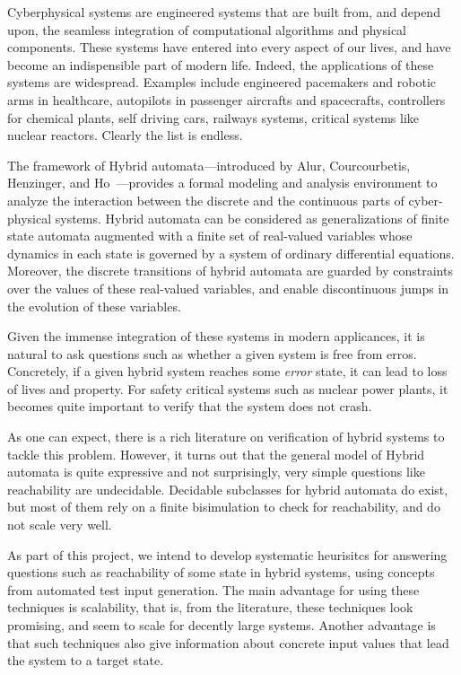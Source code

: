 Cyberphysical systems are engineered systems that are built from, 
and depend upon, the seamless integration of computational algorithms and physical components.
These systems have entered into every aspect of our lives, and have become an
indispensible part of modern life.
Indeed, the applications of these systems are widespread.
Examples include engineered pacemakers and robotic arms in healthcare, autopilots in
passenger aircrafts and spacecrafts, controllers for chemical plants,
self driving cars, railways systems, critical systems like
nuclear reactors. Clearly the list is endless.

  The framework of Hybrid automata---introduced by Alur, Courcourbetis,
  Henzinger, and Ho~\cite{ACH92}---provides a formal modeling and analysis environment to
  analyze the interaction between the discrete and the continuous parts of
  cyber-physical systems. 
  Hybrid automata can be considered as generalizations of finite state automata
  augmented with a finite set of real-valued variables whose dynamics in each
  state is governed by a system of ordinary differential equations. 
  Moreover, the discrete transitions of hybrid automata are guarded by
  constraints over the values of these real-valued variables, and enable
  discontinuous jumps in the evolution of these variables.
  


Given the immense integration of these systems in modern applicances,
it is natural to ask questions such as whether a given system is free from erros.
Concretely, if a given hybrid system reaches some \emph{error} state, it can lead 
to loss of lives and property. For safety critical systems such as nuclear power plants,
it becomes quite important to verify that the system does not crash. 

As one can expect, there is a rich literature on verification
of hybrid systems to tackle this problem. 
However, it turns out that the  general model of Hybrid automata is quite expressive
and not surprisingly, very simple questions like reachability are undecidable. 
Decidable subclasses for hybrid automata do exist, but most of them rely on a finite bisimulation
to check for reachability, and do not scale very well.

As part of this project, we intend to develop systematic heurisitcs 
for answering  questions such as reachability of some state 
in hybrid systems, using concepts from automated test input generation.
The main advantage for using these techniques is scalability, that is, from
the literature, these techniques look promising, and seem to scale for decently large systems.
Another advantage is that such techniques also give information about
concrete input values that lead the system to a target state.

